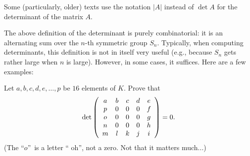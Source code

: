 Some (particularly, older) texts use the notation $\left\vert A\right\vert $
instead of $\det A$ for the determinant of the matrix $A$.

The above definition of the determinant is purely combinatorial: it is an
alternating sum over the $n$-th symmetric group $S_{n}$. Typically, when
computing determinants, this definition is not in itself very useful (e.g.,
because $S_{n}$ gets rather large when $n$ is large). However, in some cases,
it suffices. Here are a few examples:

\begin{example}
\label{exa.det.hollow5x5}Let $a,b,c,d,e,\ldots,p$ be $16$ elements of $K$.
Prove that%
\[
\det\left(
\begin{array}
[c]{ccccc}%
a & b & c & d & e\\
p & 0 & 0 & 0 & f\\
o & 0 & 0 & 0 & g\\
n & 0 & 0 & 0 & h\\
m & l & k & j & i
\end{array}
\right)  =0.
\]
(The \textquotedblleft$o$\textquotedblright\ is a letter \textquotedblleft
oh\textquotedblright, not a zero. Not that it matters much...)
\end{example}

